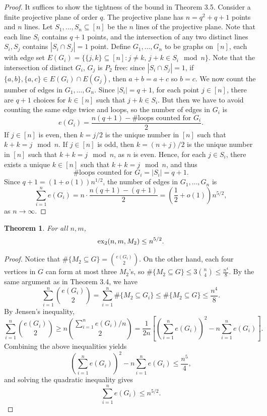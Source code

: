 \documentclass[12pt]{report}
\newtheorem{theorem}{Theorem}[chapter]
\newcommand*{\dex}{\textnormal{ex}_2}
\begin{document}
\begin{proof}
  It suffices to show the tightness of the bound in Theorem 3.5. Consider a finite projective plane of order $q$. The projective plane has $n = q^2 + q + 1$ points and $n$ lines. Let $S_1, \ldots, S_n \subseteq [n]$ be the $n$ lines of the projective plane. Note that each line $S_i$ contains $q + 1$ points, and the intersection of any two distinct lines $S_i, S_j$ contains $|S_i \cap S_j| = 1$ point. Define $G_1, \ldots, G_n$ to be graphs on $[n]$, each with edge set $E(G_i) = \{\{j, k\} \subseteq [n] : j \neq k, \, j + k \in S_i \mod n\}$. Note that the intersection of distinct $G_i$, $G_j$ is $P_2$ free: since $|S_i \cap S_j| = 1$, if $\{a, b\}, \{a, c\} \in E(G_i) \cap E(G_j)$, then $a + b = a + c$ so $b = c$. We now count the number of edges in $G_1, \ldots, G_n$. Since $|S_i| = q + 1$, for each point $j \in [n]$, there are $q + 1$ choices for $k \in [n]$ such that $j + k \in S_i$. But then we have to avoid counting the same edge twice and loops, so the number of edges in $G_i$ is
  \[
    e(G_i) = \frac{n(q + 1) - \#\text{loops counted for } G_i}{2}.
  \]
  If $j \in [n]$ is even, then $k = j/2$ is the unique number in $[n]$ such that $k + k = j \mod n$. If $j \in [n]$ is odd, then $k = (n + j)/2$ is the unique number in $[n]$ such that $k + k = j \mod n$, as $n$ is even. Hence, for each $j \in S_i$, there exists a unique $k \in [n]$ such that $k + k = j \mod n$, and thus
  \[
    \#\text{loops counted for } G_i = |S_i| = q + 1.
  \]
  Since $q + 1 = (1 + o(1))n^{1/2}$, the number of edges in $G_1, \ldots, G_n$ is
  \[
    \sum_{i = 1}^n e(G_i) = n \cdot \frac{n(q + 1) - (q + 1)}{2} = \left(\frac{1}{2} + o(1)\right)n^{5/2},
  \]
  as $n \to \infty$.
\end{proof}

\begin{theorem}
  For all $n, m$,
  \[
    \dex(n, m, M_2) \leq n^{5/2}.
  \]
\end{theorem}

\begin{proof}
  Notice that $\#\{M_2 \subseteq G\} = \binom{e(G_i)}{2}$. On the other hand, each four vertices in $G$ can form at most three $M_2$'s, so $\#\{M_2 \subseteq G\} \leq 3\binom{n}{4} \leq \frac{n^4}{8}$. By the same argument as in Theorem 3.4, we have 
  \[
    \sum_{i = 1}^n \binom{e(G_i)}{2} = \sum_{i = 1}^n \#\{M_2 \subseteq G_i\} \leq \#\{M_2 \subseteq G\} \leq \frac{n^4}{8}.
  \]
  By Jensen's inequality,
  \[
    \sum_{i = 1}^n \binom{e(G_i)}{2} \geq n\binom{\sum_{i = 1}^n e(G_i)/n}{2} = \frac{1}{2n}\left[\left(\sum_{i = 1}^n e(G_i)\right)^2 - n\sum_{i = 1}^n e(G_i)\right].
  \]
  Combining the above inequalities yields
  \[
    \left(\sum_{i = 1}^n e(G_i)\right)^2 - n\sum_{i = 1}^n e(G_i) \leq \frac{n^5}{4},
  \]
  and solving the quadratic inequality gives
  \[
    \sum_{i = 1}^n e(G_i) \leq n^{5/2}.
  \]
\end{proof}
\end{document}
